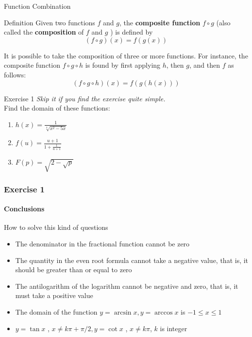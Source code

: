 \begin{frame}{Function Combination}
    \begin{block}{Definition}
        Given two functions $f$ and $g$, the \textbf{composite function} $f \circ g$ (also called the \textbf{composition} of $f$ and $g$ ) is defined by
        \begin{equation*}
            (f \circ g)(x)=f(g(x))
        \end{equation*}
    \end{block}
    \bigskip
    It is possible to take the composition of three or more functions. For instance, the composite function $f \circ g \circ h$ is found by first applying $h$, then $g$, and then $f$ as follows:
    $$
        (f \circ g \circ h)(x)=f(g(h(x)))
    $$
\end{frame}

\begin{frame}{Exercise 1}
    \textit{Skip it if you find the exercise quite simple.}\\
    \bigskip
    Find the domain of these functions:
    \begin{enumerate}
        \item $h(x)=\frac{1}{\sqrt[4]{x^{2}-5 x}}$\\
        \item $f(u)=\frac{u+1}{1+\frac{1}{u+1}}$\\
        \item $F(p)=\sqrt{2-\sqrt{p}}$
    \end{enumerate}
\end{frame}

\begin{frame}
    \frametitle{Exercise 1}
    \framesubtitle{Conclusions}
    \begin{block}{How to solve this kind of questions}
        \begin{itemize}
            \item The denominator in the fractional function cannot be zero
            \item The quantity in the even root formula cannot take a negative value, that is, it should be greater than or equal to zero
            \item The antilogarithm of the logarithm cannot be negative and zero, that is, it must take a positive value
            \item The domain of the function $y=\arcsin x, y=\arccos x$ is $-1 \leqslant x \leqslant 1$
            \item $y=\tan x$ , $x \neq k \pi+\pi / 2, y=\cot x$ , $x \neq k \pi$, $k$ is integer
        \end{itemize}
    \end{block}
\end{frame}

